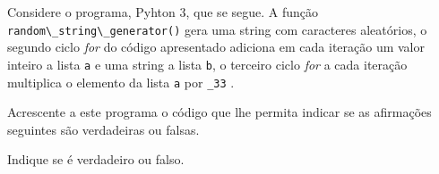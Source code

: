 \documentclass[12pt,varwidth=16cm,border=1pt]{standalone}
\begin{document}
Considere o programa, Pyhton 3, que se segue. A função \verb+random\_string\_generator()+ gera uma string com caracteres aleatórios, o segundo ciclo \textit{for} do código apresentado adiciona em cada iteração um valor inteiro a lista \verb+a+ e uma string a lista \verb+b+, o terceiro ciclo \textit{for} a cada iteração multiplica o elemento da lista \verb+a+ por \verb+_33+ .



Acrescente a este programa o código que lhe permita indicar se as
afirmações seguintes são verdadeiras ou falsas.

Indique se é verdadeiro ou falso.
\end{document}

